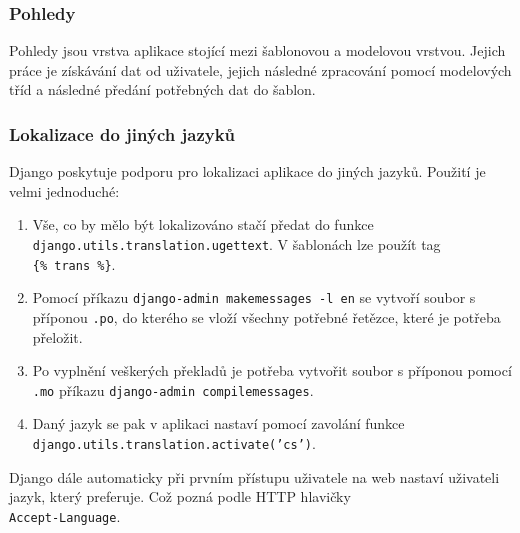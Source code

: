 \subsubsection{Pohledy}
Pohledy jsou vrstva aplikace stojící mezi šablonovou a modelovou vrstvou. Jejich práce je získávání dat od uživatele, jejich následné zpracování pomocí modelových tříd a následné předání potřebných dat do šablon.

\subsubsection{Lokalizace do jiných jazyků}
Django poskytuje podporu pro lokalizaci aplikace do jiných jazyků. Použití je velmi jednoduché:
\begin{enumerate}
    \item Vše, co by mělo být lokalizováno stačí předat do funkce \\\texttt{django.utils.translation.ugettext}. V šablonách lze použít tag \\\mbox{\texttt{\{\% trans \%\}}}.
    \item Pomocí příkazu \texttt{django-admin makemessages -l en} se vytvoří soubor s příponou \texttt{.po}, do kterého se vloží všechny potřebné řetězce, které je potřeba přeložit.
    \item Po vyplnění veškerých překladů je potřeba vytvořit soubor s příponou pomocí \texttt{.mo} příkazu \texttt{django-admin compilemessages}.
    \item Daný jazyk se pak v aplikaci nastaví pomocí zavolání funkce \\\texttt{django.utils.translation.activate('cs')}.
\end{enumerate}

Django dále automaticky při prvním přístupu uživatele na web nastaví uživateli jazyk, který preferuje. Což pozná podle HTTP hlavičky \\\texttt{Accept-Language}.

